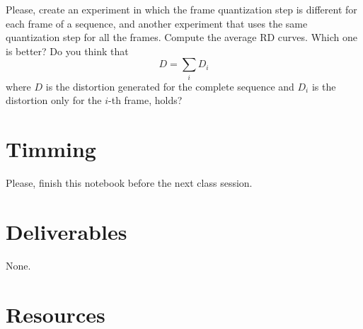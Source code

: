 Please, create an experiment in which the frame quantization step is
different for each frame of a sequence, and another experiment that
uses the same quantization step for all the frames. Compute the
average RD curves. Which one is better? Do you think that
\begin{equation*}
  D = \sum_i D_i
\end{equation*}
where $D$ is the distortion generated for the complete sequence and
$D_i$ is the distortion only for the $i$-th frame, holds?


\section{Timming}

Please, finish this notebook before the next class session.

\section{Deliverables}

None.

\section{Resources}


